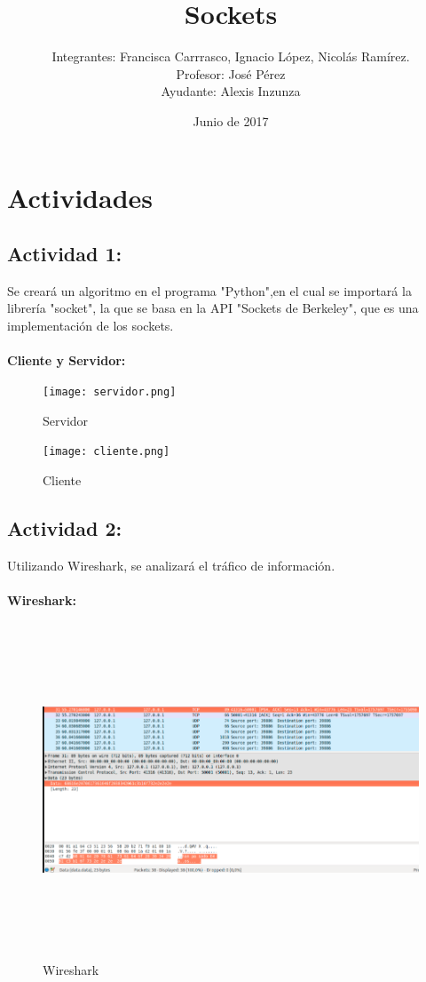 \documentclass{udpreport}
\title{Sockets}
\author{Integrantes: Francisca Carrrasco, Ignacio López, Nicolás Ramírez.\\Profesor: José Pérez
\\Ayudante: Alexis Inzunza}
\date{Junio de 2017}
\begin{document}
\maketitle
\tableofcontents
\listoffigures
 
\chapter{Actividades}
	\section{Actividad 1:}
	    Se creará un algoritmo en el programa "Python",en el cual se importará la librería "socket", la que se basa en la API "Sockets de Berkeley", que es una implementación de los sockets.\\\\
		{\large \bf{Cliente y Servidor: }}
		\begin{figure}[h]
    \centering
    \texttt{[image: servidor.png]}
    \caption{Servidor}
    \texttt{[image: cliente.png]}
    \caption{Cliente}
    \end{figure}
    \newpage
   

	
  
	\section{Actividad 2:}
        Utilizando Wireshark, se analizará el tráfico de información.
        \\\\
	{\large \bf{Wireshark: }}\\ 
	\begin{figure}[h]
    \centering
    \includegraphics[width=18cm, height=10cm]{capturaalacapturaalacaptura.png}
    \caption{Wireshark}
    \end{figure}
    \newpage
\end{document}
